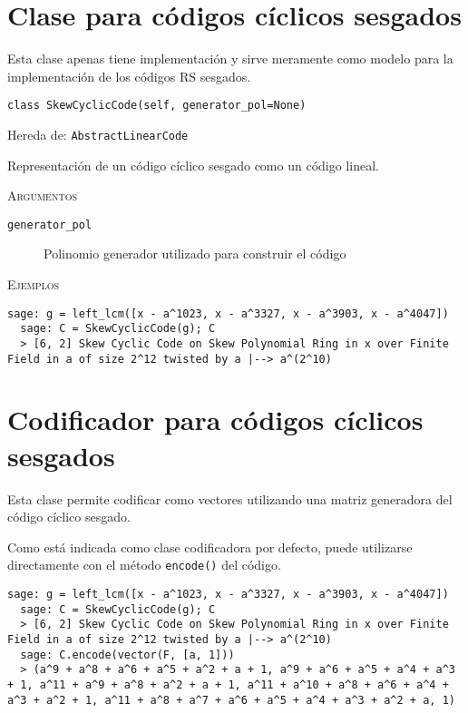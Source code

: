 \section{Clase para códigos cíclicos sesgados}

Esta clase apenas tiene implementación y sirve meramente como modelo para la implementación de los códigos RS sesgados.

\texttt{class SkewCyclicCode(self, generator\_pol=None)}

Hereda de: \texttt{AbstractLinearCode}

Representación de un código cíclico sesgado como un código lineal.

\textsc{Argumentos}

\begin{description}
  \item[\texttt{generator\_pol}] Polinomio generador utilizado para construir el código
\end{description}

\textsc{Ejemplos}

\begin{lstlisting}[gobble=2]
  sage: g = left_lcm([x - a^1023, x - a^3327, x - a^3903, x - a^4047])
  sage: C = SkewCyclicCode(g); C
  > [6, 2] Skew Cyclic Code on Skew Polynomial Ring in x over Finite Field in a of size 2^12 twisted by a |--> a^(2^10)
\end{lstlisting}


\section{Codificador para códigos cíclicos sesgados}

Esta clase permite codificar como vectores utilizando una matriz generadora del código cíclico sesgado.

Como está indicada como clase codificadora por defecto, puede utilizarse directamente con el método \texttt{encode()} del código.

\begin{lstlisting}[gobble=2]
  sage: g = left_lcm([x - a^1023, x - a^3327, x - a^3903, x - a^4047])
  sage: C = SkewCyclicCode(g); C
  > [6, 2] Skew Cyclic Code on Skew Polynomial Ring in x over Finite Field in a of size 2^12 twisted by a |--> a^(2^10)
  sage: C.encode(vector(F, [a, 1]))
  > (a^9 + a^8 + a^6 + a^5 + a^2 + a + 1, a^9 + a^6 + a^5 + a^4 + a^3 + 1, a^11 + a^9 + a^8 + a^2 + a + 1, a^11 + a^10 + a^8 + a^6 + a^4 + a^3 + a^2 + 1, a^11 + a^8 + a^7 + a^6 + a^5 + a^4 + a^3 + a^2 + a, 1)
\end{lstlisting}


